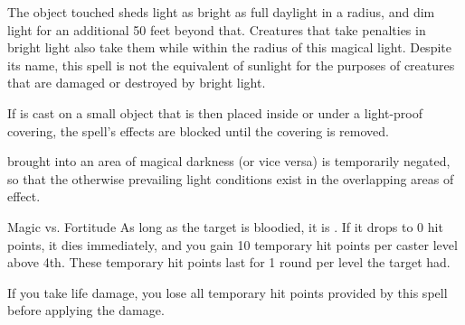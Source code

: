 \begin{spellheader}
    \spellrng{\rngtouch}
    \spelldur{\durlong \dismissable}
\end{spellheader}
\begin{spelleffects}
    \spelleffect The object touched sheds light as bright as full daylight in a \arealarge radius, and dim light for an additional 50 feet beyond that. Creatures that take penalties in bright light also take them while within the radius of this magical light. Despite its name, this spell is not the equivalent of sunlight for the purposes of creatures that are damaged or destroyed by bright light.
    \par If  is cast on a small object that is then placed inside or under a light-proof covering, the spell's effects are blocked until the covering is removed.
\end{spelleffects}
\begin{spellfooter}
    \spellnotes {} brought into an area of magical darkness (or vice versa) is temporarily negated, so that the otherwise prevailing light conditions exist in the overlapping areas of effect.
\end{spellfooter}

\begin{spellheader}
    \spellrng{\rngmed}
\end{spellheader}
\begin{spelleffects}
    \begin{spellattack}{Magic vs. Fortitude}
        \spellsuccess As long as the target is bloodied, it is \vulnerable. If it drops to 0 hit points, it dies immediately, and you gain 10 temporary hit points  per caster level above 4th. These temporary hit points last for 1 round per level the target had.
    \end{spellattack}
\end{spelleffects}
\begin{spellfooter}
    \spellnotes If you take life damage, you lose all temporary hit points provided by this spell before applying the damage.
\end{spellfooter}

